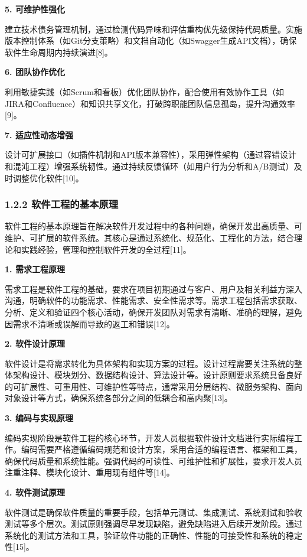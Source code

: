 \textbf{5. 可维护性强化}

建立技术债务管理机制，通过检测代码异味和评估重构优先级保持代码质量。实施版本控制体系（如Git分支策略）和文档自动化（如Swagger生成API文档），确保软件生命周期内持续演进{[}8{]}。

\textbf{6. 团队协作优化}

利用敏捷实践（如Scrum和看板）优化团队协作，配合使用有效协作工具（如JIRA和Confluence）和知识共享文化，打破跨职能团队信息孤岛，提升沟通效率{[}9{]}。

\textbf{7. 适应性动态增强}

设计可扩展接口（如插件机制和API版本兼容性），采用弹性架构（通过容错设计和混沌工程）增强系统韧性。通过持续反馈循环（如用户行为分析和A/B测试）及时调整优化软件{[}10{]}。

\subsubsection{1.2.2 软件工程的基本原理}\label{ux8f6fux4ef6ux5de5ux7a0bux7684ux57faux672cux539fux7406}

软件工程的基本原理旨在解决软件开发过程中的各种问题，确保开发出高质量、可维护、可扩展的软件系统。其核心是通过系统化、规范化、工程化的方法，结合理论和实践经验，管理和控制软件开发的全过程{[}11{]}。

\textbf{1. 需求工程原理}

需求工程是软件工程的基础，要求在项目初期通过与客户、用户及相关利益方深入沟通，明确软件的功能需求、性能需求、安全性需求等。需求工程包括需求获取、分析、定义和验证四个核心活动，确保开发团队对需求有清晰、准确的理解，避免因需求不清晰或误解而导致的返工和错误{[}12{]}。

\textbf{2. 软件设计原理}

软件设计是将需求转化为具体架构和实现方案的过程。设计过程需要关注系统的整体架构设计、模块划分、数据结构设计、算法设计等。设计原则要求系统具备良好的可扩展性、可重用性、可维护性等特点，通常采用分层结构、微服务架构、面向对象设计等方式，确保系统各部分之间的低耦合和高内聚{[}13{]}。

\textbf{3. 编码与实现原理}

编码实现阶段是软件工程的核心环节，开发人员根据软件设计文档进行实际编程工作。编码需要严格遵循编码规范和设计方案，采用合适的编程语言、框架和工具，确保代码质量和系统性能。强调代码的可读性、可维护性和扩展性，要求开发人员注重注释、模块化设计、重用现有组件等{[}14{]}。

\textbf{4. 软件测试原理}

软件测试是确保软件质量的重要手段，包括单元测试、集成测试、系统测试和验收测试等多个层次。测试原则强调尽早发现缺陷，避免缺陷进入后续开发阶段。通过系统化的测试方法和工具，验证软件功能的正确性、性能的可接受性和系统的稳定性{[}15{]}。


